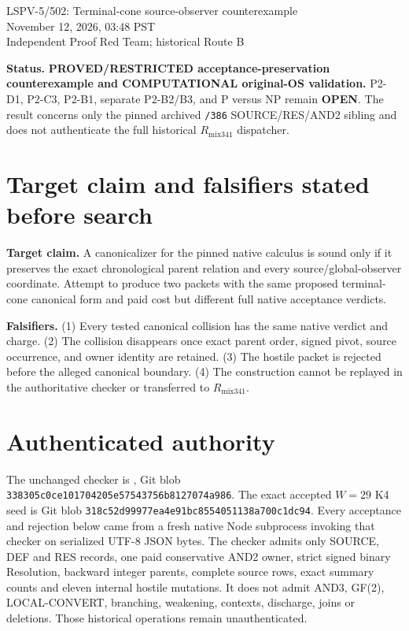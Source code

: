 \documentclass[11pt]{article}
\begin{document}
\begin{center}
{\Large LSPV-5/502: Terminal-cone source-observer counterexample}\\[3pt]
November 12, 2026, 03:48 PST\\
Independent Proof Red Team; historical Route B
\end{center}

\noindent\textbf{Status.}
\textbf{PROVED/RESTRICTED acceptance-preservation counterexample and COMPUTATIONAL original-OS validation.}
P2-D1, P2-C3, P2-B1, separate P2-B2/B3, and P versus NP remain \textbf{OPEN}.
The result concerns only the pinned archived \texttt{/386} SOURCE/RES/AND2 sibling and does not authenticate the full historical \(R_{\mathrm{mix341}}\) dispatcher.

\section*{Target claim and falsifiers stated before search}
\textbf{Target claim.}
A canonicalizer for the pinned native calculus is sound only if it preserves the exact chronological parent relation and every source/global-observer coordinate. Attempt to produce two packets with the same proposed terminal-cone canonical form and paid cost but different full native acceptance verdicts.

\textbf{Falsifiers.}
(1) Every tested canonical collision has the same native verdict and charge.
(2) The collision disappears once exact parent order, signed pivot, source occurrence, and owner identity are retained.
(3) The hostile packet is rejected before the alleged canonical boundary.
(4) The construction cannot be replayed in the authoritative checker or transferred to \(R_{\mathrm{mix341}}\).

\section*{Authenticated authority}
The unchanged checker is , Git blob \texttt{338305c0ce101704205e57543756b8127074a986}.
The exact accepted \(W=29\) K4 seed is Git blob \texttt{318c52d99977ea4e91bc8554051138a700c1dc94}.
Every acceptance and rejection below came from a fresh native Node subprocess invoking that checker on serialized UTF-8 JSON bytes.
The checker admits only SOURCE, DEF and RES records, one paid conservative AND2 owner, strict signed binary Resolution, backward integer parents, complete source rows, exact summary counts and eleven internal hostile mutations.
It does not admit AND3, GF(2), LOCAL-CONVERT, branching, weakening, contexts, discharge, joins or deletions.
Those historical operations remain unauthenticated.
\end{document}
